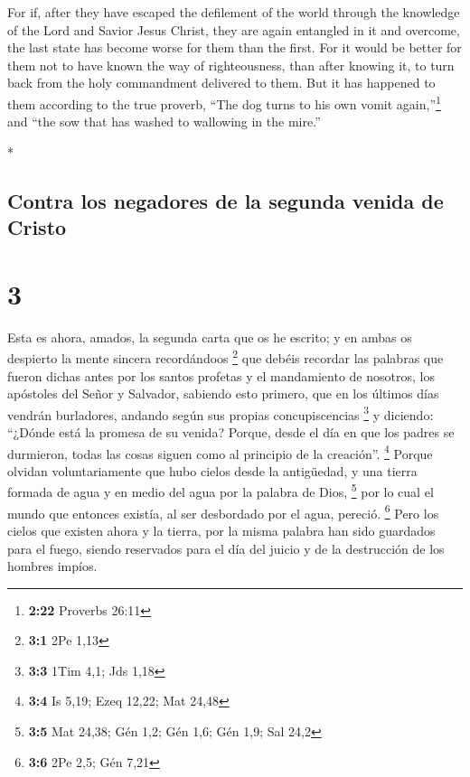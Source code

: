 \begin{paracol}{2}
\begin{otherlanguage}{english}
 For if, after they have escaped the defilement of the
world through the knowledge of the Lord and Savior Jesus Christ, they
are again entangled in it and overcome, the last state has become worse
for them than the first.  For it would be better for them
not to have known the way of righteousness, than after knowing it, to
turn back from the holy commandment delivered to them. 
But it has happened to them according to the true proverb, ``The dog
turns to his own vomit again,''\footnote{\textbf{2:22} Proverbs 26:11}
and ``the sow that has washed to wallowing in the mire.''

\end{otherlanguage}

\switchcolumn[0]*

\hypertarget{contra-los-negadores-de-la-segunda-venida-de-cristo}{%
\subsection{Contra los negadores de la segunda venida de
Cristo}\label{contra-los-negadores-de-la-segunda-venida-de-cristo}}

\hypertarget{section-4}{%
\section{3}\label{section-4}}

 Esta es ahora, amados, la segunda carta que os he
escrito; y en ambas os despierto la mente sincera recordándoos
\footnote{\textbf{3:1} 2Pe 1,13}  que debéis recordar las
palabras que fueron dichas antes por los santos profetas y el
mandamiento de nosotros, los apóstoles del Señor y Salvador,
 sabiendo esto primero, que en los últimos días vendrán
burladores, andando según sus propias concupiscencias \footnote{\textbf{3:3}
  1Tim 4,1; Jds 1,18}  y diciendo: ``¿Dónde está la
promesa de su venida? Porque, desde el día en que los padres se
durmieron, todas las cosas siguen como al principio de la creación''.
\footnote{\textbf{3:4} Is 5,19; Ezeq 12,22; Mat 24,48} 
Porque olvidan voluntariamente que hubo cielos desde la antigüedad, y
una tierra formada de agua y en medio del agua por la palabra de Dios,
\footnote{\textbf{3:5} Mat 24,38; Gén 1,2; Gén 1,6; Gén 1,9; Sal 24,2}
 por lo cual el mundo que entonces existía, al ser
desbordado por el agua, pereció. \footnote{\textbf{3:6} 2Pe 2,5; Gén
  7,21}  Pero los cielos que existen ahora y la tierra,
por la misma palabra han sido guardados para el fuego, siendo reservados
para el día del juicio y de la destrucción de los hombres impíos.


\end{paracol}
